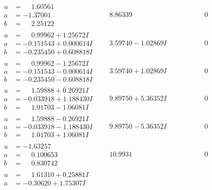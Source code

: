 \documentclass[1p]{elsarticle_modified}
\theoremstyle{definition}
\begin{document}
$$\begin{array}{c|c|c}
\begin{aligned}
u &= \phantom{-}1.60561\phantom{ +0.000000I} \\
a &= -1.37001\phantom{ +0.000000I} \\
b &= \phantom{-}2.25122\phantom{ +0.000000I}\end{aligned}
 & \phantom{-}8.86339\phantom{ +0.000000I} & \phantom{-0.000000 } 0 \\ \hline\begin{aligned}
u &= \phantom{-}0.99962 + 1.25672 I \\
a &= -0.151543 + 0.000614 I \\
b &= -0.235450 + 0.608818 I\end{aligned}
 & \phantom{-}3.59740 - 1.02869 I & \phantom{-0.000000 } 0 \\ \hline\begin{aligned}
u &= \phantom{-}0.99962 - 1.25672 I \\
a &= -0.151543 - 0.000614 I \\
b &= -0.235450 - 0.608818 I\end{aligned}
 & \phantom{-}3.59740 + 1.02869 I & \phantom{-0.000000 } 0 \\ \hline\begin{aligned}
u &= \phantom{-}1.59888 + 0.26921 I \\
a &= -0.033918 + 1.188430 I \\
b &= \phantom{-}1.01703 - 1.06081 I\end{aligned}
 & \phantom{-}9.89750 + 5.36352 I & \phantom{-0.000000 } 0 \\ \hline\begin{aligned}
u &= \phantom{-}1.59888 - 0.26921 I \\
a &= -0.033918 - 1.188430 I \\
b &= \phantom{-}1.01703 + 1.06081 I\end{aligned}
 & \phantom{-}9.89750 - 5.36352 I & \phantom{-0.000000 } 0 \\ \hline\begin{aligned}
u &= -1.63257\phantom{ +0.000000I} \\
a &= \phantom{-}0.100653\phantom{ +0.000000I} \\
b &= \phantom{-}0.830742\phantom{ +0.000000I}\end{aligned}
 & \phantom{-}10.9931\phantom{ +0.000000I} & \phantom{-0.000000 } 0 \\ \hline\begin{aligned}
u &= \phantom{-}1.61310 + 0.25881 I \\
a &= -0.30620 + 1.75307 I \\

\end{aligned}
\end{array}$$
\end{document}
